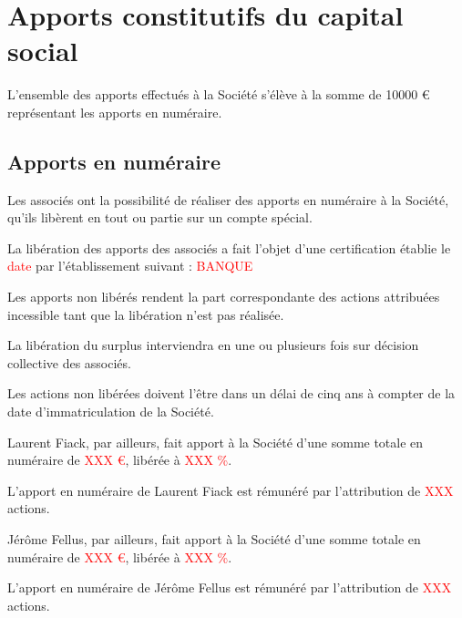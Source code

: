 \documentclass[a4paper,12pt]{report}
\begin{document}
\section{Apports constitutifs du capital social}

L'ensemble des apports effectués à la Société s'élève à la somme de 10000 € représentant les apports en numéraire.\\

\subsection{Apports en numéraire}
Les associés ont la possibilité de réaliser des apports en numéraire à la Société, qu'ils libèrent en tout ou partie sur un compte spécial.

La libération des apports des associés a fait l'objet d'une certification établie le \textcolor{red}{date} par l'établissement suivant : \textcolor{red}{BANQUE}

Les apports non libérés rendent la part correspondante des actions attribuées incessible tant que la libération n'est pas réalisée.

La libération du surplus interviendra en une ou plusieurs fois sur décision collective des associés.

Les actions non libérées doivent l'être dans un délai de cinq ans à compter de la date d'immatriculation de la Société.

Laurent Fiack, par ailleurs, fait apport à la Société d'une somme totale en numéraire de \textcolor{red}{XXX €}, libérée à \textcolor{red}{XXX \%}.

L'apport en numéraire de Laurent Fiack est rémunéré par l'attribution de \textcolor{red}{XXX} actions.

Jérôme Fellus, par ailleurs, fait apport à la Société d'une somme totale en numéraire de \textcolor{red}{XXX €}, libérée à \textcolor{red}{XXX \%}.

L'apport en numéraire de Jérôme Fellus est rémunéré par l'attribution de \textcolor{red}{XXX} actions.
\end{document}
